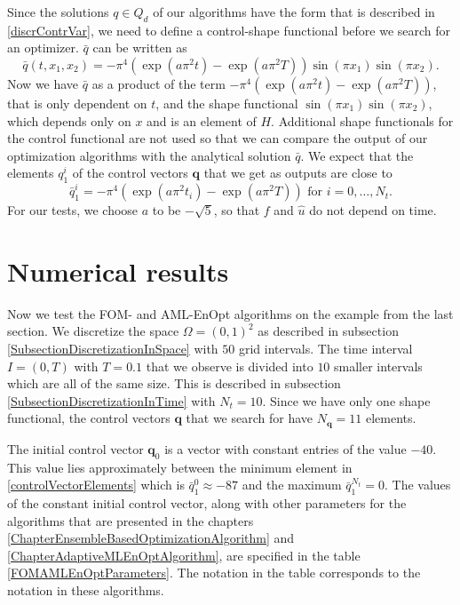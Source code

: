 Since the solutions $q\in Q_d$ of our algorithms have the form that is described in \eqref{discrContrVar}, we need to define a control-shape functional before we search for an optimizer. $\bar{q}$ can be written as
\begin{displaymath}
\bar{q}(t,x_1,x_2)=-\pi^4(\exp(a\pi^2t)-\exp(a\pi^2T))\sin(\pi x_1)\sin(\pi x_2).
\end{displaymath}
Now we have $\bar{q}$ as a product of the term $-\pi^4(\exp(a\pi^2t)-\exp(a\pi^2T))$, that is only dependent on $t$, and the shape functional $\sin(\pi x_1)\sin(\pi x_2)$, which depends only on $x$ and is an element of $H$. Additional shape functionals for the control functional are not used so that we can compare the output of our optimization algorithms with the analytical solution $\bar{q}$. We expect that the elements $q^i_1$ of the control vectors $\mathbf{q}$ that we get as outputs are close to
\begin{equation}
\label{controlVectorElements}
\bar{q}^i_1=-\pi^4(\exp(a\pi^2t_i)-\exp(a\pi^2T))\text{ for }i=0,\dotsc,N_t.
\end{equation}
For our tests, we choose $a$ to be $-\sqrt{5}$, so that $f$ and $\hat{u}$ do not depend on time.

\section{Numerical results}

Now we test the FOM- and AML-EnOpt algorithms on the example from the last section. We discretize the space $\Omega=(0,1)^2$ as described in subsection \ref{SubsectionDiscretizationInSpace} with $50$ grid intervals. The time interval $I=(0,T)$ with $T=0.1$ that we observe is divided into $10$ smaller intervals which are all of the same size. This is described in subsection \ref{SubsectionDiscretizationInTime} with $N_t=10$. Since we have only one shape functional, the control vectors $\mathbf{q}$ that we search for have $N_\mathbf{q}=11$ elements.

The initial control vector $\mathbf{q}_0$ is a vector with constant entries of the value $-40$. This value lies approximately between the minimum element in \eqref{controlVectorElements} which is $\bar{q}^0_1\approx-87$ and the maximum $\bar{q}^{N_t}_1=0$. The values of the constant initial control vector, along with other parameters for the algorithms that are presented in the chapters \ref{ChapterEnsembleBasedOptimizationAlgorithm} and \ref{ChapterAdaptiveMLEnOptAlgorithm}, are specified in the table \ref{FOMAMLEnOptParameters}. The notation in the table corresponds to the notation in these algorithms.

